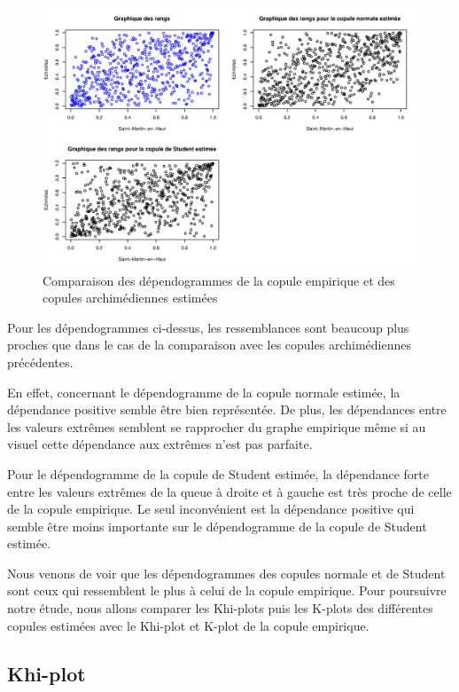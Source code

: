 \noindent%
\begin{figure}[H]
    \begin{center}
      \includegraphics[width=17 cm, angle=0]{./pictures/dependellip.png}
      \centering\caption{\label{2}Comparaison des dépendogrammes de la copule empirique et des copules archimédiennes estimées}
    \end{center}
\end{figure}

Pour les dépendogrammes ci-dessus, les ressemblances sont beaucoup plus proches que dans le cas de la comparaison avec les copules archimédiennes précédentes.

En effet, concernant le dépendogramme de la copule normale estimée, la dépendance positive semble être bien représentée. De plus, les dépendances entre les valeurs extrêmes semblent se rapprocher du graphe empirique même si au visuel cette dépendance aux extrêmes n'est pas parfaite.

Pour le dépendogramme de la copule de Student estimée, la dépendance forte entre les valeurs extrêmes de la queue à droite et à gauche est très proche de celle de la copule empirique. Le seul inconvénient est la dépendance positive qui semble être moins importante sur le dépendogramme de la copule de Student estimée.

Nous venons de voir que les dépendogrammes des copules normale et de Student sont ceux qui ressemblent le plus à celui de la copule empirique. Pour poursuivre notre étude, nous allons comparer les Khi-plots puis les K-plots des différentes copules estimées avec le Khi-plot et K-plot de la copule empirique.


\subsection{Khi-plot}


